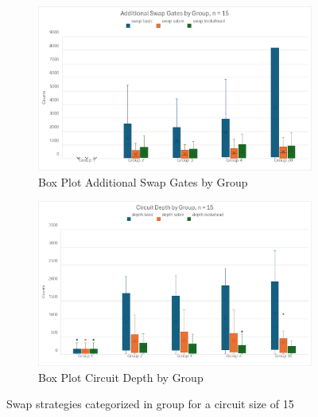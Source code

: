 \begin{figure}[htb]
    \centering
    \begin{subfigure}{0.48\linewidth}
        \includegraphics[width=\linewidth]{image/chart_box_plot_group.png}
        \caption{Box Plot Additional Swap Gates by Group}
        \label{fig:chart-box-plot-group}
    \end{subfigure}
    \begin{subfigure}{0.48\linewidth}
        \includegraphics[width=\linewidth]{image/chart_box_plot_group_depth.png}
        \caption{Box Plot Circuit Depth by Group}
        \label{fig:chart-box-plot-group-depth}
    \end{subfigure}
    \caption{Swap strategies categorized in group for a circuit size of 15}
    \label{fig:chart-box-plot-group-all}
\end{figure}

